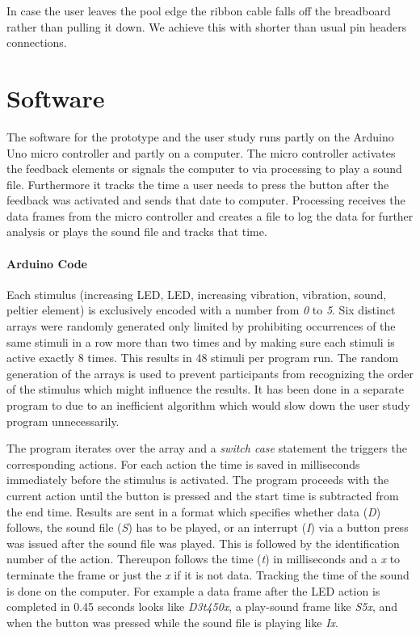 In case the user leaves the pool edge the ribbon cable falls off the breadboard rather than pulling it down. 
We achieve this with shorter than usual pin headers connections.

\section{Software}

The  software for the prototype and the user study runs partly on the Arduino Uno micro controller and partly on a computer.
The micro controller activates the feedback elements or signals the computer to via processing to play a sound file. 
Furthermore it tracks the time a user needs to press the button after the feedback was activated and sends that date to computer.
Processing receives the data frames from the micro controller and creates a file to log the data for further analysis or plays the sound file and tracks that time.

\paragraph{Arduino Code}
Each stimulus (increasing LED, LED, increasing vibration, vibration, sound, peltier element) is exclusively encoded with a number from \emph{0} to \emph{5}.
Six distinct arrays were randomly generated only limited by prohibiting occurrences of the same stimuli in a row more than two times and by making sure each stimuli is active exactly 8 times.
This results in 48 stimuli per program run.
The random generation of the arrays is used to prevent participants from recognizing the order of the stimulus which might influence the results.
It has been done in a  separate program to due to an inefficient algorithm which would slow down the user study program unnecessarily.

The program iterates over the array and a \emph{switch case} statement the triggers the corresponding actions.
For each action the time is saved in milliseconds immediately before the stimulus is activated.
The program proceeds with the current action until the button is pressed and the start time is subtracted from the end time.
Results are sent in a format which specifies whether data (\emph{D}) follows, the sound file (\emph{S}) has to be played, or an interrupt (\emph{I}) via a button press was issued after the sound file was played. 
This is followed by the identification number of the action.
Thereupon follows the time (\emph{t}) in milliseconds and a \emph{x} to terminate the frame or just the \emph{x} if it is not data.
Tracking the time of the sound is done on the computer.
For example a data frame after the LED action is completed in 0.45 seconds looks like \emph{D3t450x}, a play-sound frame like \emph{S5x}, and when the button was pressed while the sound file is playing like \emph{Ix}.

